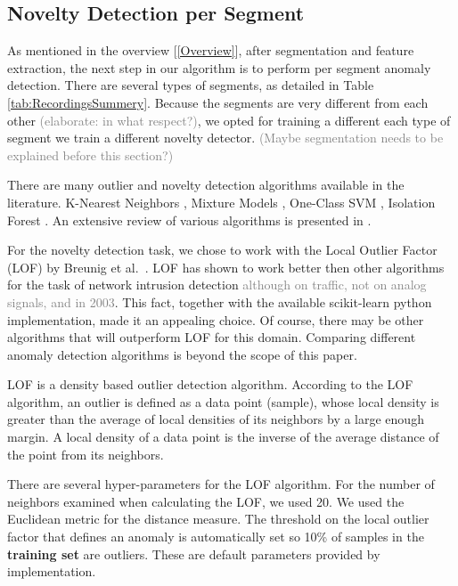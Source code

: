 \documentclass[conference]{IEEEtran}
\begin{document}
\subsection{Novelty Detection per Segment}
  As mentioned in the overview [\ref{Overview}], after segmentation and feature  extraction, the next step in our algorithm is to perform per segment anomaly  detection. There are several types of segments, as detailed in Table \ref{tab:RecordingsSummery}. Because the segments are very different from each other \textcolor{gray}{(elaborate: in what respect?)}, we opted for training a different each type of segment we train a different novelty detector.
  \textcolor{gray}{(Maybe segmentation needs to be explained before this section?)}
  
  There are many outlier and novelty detection algorithms available in the literature. K-Nearest Neighbors \cite{hautamaki2004outlier}, Mixture Models \cite{}, One-Class SVM \cite{}, Isolation Forest \cite{liu2008isolation}. An extensive review of various algorithms is presented in \cite{pimentel2014review}.
  
  For the novelty detection task, we chose to work with the Local Outlier Factor (LOF) by Breunig et al.\ \cite{breunig2000lof}. LOF has shown to work better then other algorithms for the task of network intrusion detection\cite{lazarevic2003comparative} \textcolor{gray}{although on traffic, not on analog signals, and in 2003}. This fact, together with the available scikit-learn \cite{scikit-learn} python implementation, made it an appealing choice. Of course, there may be other algorithms that will outperform LOF for this domain. Comparing different anomaly detection algorithms is beyond the scope of this paper.
  
  LOF is a density based outlier detection algorithm. According to the LOF algorithm, an outlier is defined as a data point (sample), whose local density is greater than the average of local densities of its neighbors by a large enough margin. A local density of a data point is the inverse of the average distance of the point from its neighbors.
  
  There are several hyper-parameters for the LOF algorithm. For the number of neighbors examined when calculating the LOF, we used 20. We used the Euclidean metric for the distance measure. The threshold on the local outlier factor that defines an anomaly is automatically set so 10\% of samples in the \textbf{training set} are outliers. These are default parameters provided by implementation.
  
\end{document}
